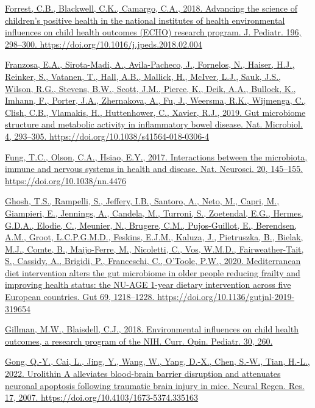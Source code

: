 \documentclass[
]{article}
\begin{document}
\href{https://www.zotero.org/google-docs/?uydJ8e}{Forrest, C.B.,
Blackwell, C.K., Camargo, C.A., 2018. Advancing the science of
children's positive health in the national institutes of health
environmental influences on child health outcomes (ECHO) research
program. J. Pediatr. 196, 298--300.
https://doi.org/10.1016/j.jpeds.2018.02.004}

\href{https://www.zotero.org/google-docs/?uydJ8e}{Franzosa, E.A.,
Sirota-Madi, A., Avila-Pacheco, J., Fornelos, N., Haiser, H.J., Reinker,
S., Vatanen, T., Hall, A.B., Mallick, H., McIver, L.J., Sauk, J.S.,
Wilson, R.G., Stevens, B.W., Scott, J.M., Pierce, K., Deik, A.A.,
Bullock, K., Imhann, F., Porter, J.A., Zhernakova, A., Fu, J., Weersma,
R.K., Wijmenga, C., Clish, C.B., Vlamakis, H., Huttenhower, C., Xavier,
R.J., 2019. Gut microbiome structure and metabolic activity in
inflammatory bowel disease. Nat. Microbiol. 4, 293--305.
https://doi.org/10.1038/s41564-018-0306-4}

\href{https://www.zotero.org/google-docs/?uydJ8e}{Fung, T.C., Olson,
C.A., Hsiao, E.Y., 2017. Interactions between the microbiota, immune and
nervous systems in health and disease. Nat. Neurosci. 20, 145--155.
https://doi.org/10.1038/nn.4476}

\href{https://www.zotero.org/google-docs/?uydJ8e}{Ghosh, T.S., Rampelli,
S., Jeffery, I.B., Santoro, A., Neto, M., Capri, M., Giampieri, E.,
Jennings, A., Candela, M., Turroni, S., Zoetendal, E.G., Hermes, G.D.A.,
Elodie, C., Meunier, N., Brugere, C.M., Pujos-Guillot, E., Berendsen,
A.M., Groot, L.C.P.G.M.D., Feskins, E.J.M., Kaluza, J., Pietruszka, B.,
Bielak, M.J., Comte, B., Maijo-Ferre, M., Nicoletti, C., Vos, W.M.D.,
Fairweather-Tait, S., Cassidy, A., Brigidi, P., Franceschi, C., O'Toole,
P.W., 2020. Mediterranean diet intervention alters the gut microbiome in
older people reducing frailty and improving health status: the NU-AGE
1-year dietary intervention across five European countries. Gut 69,
1218--1228. https://doi.org/10.1136/gutjnl-2019-319654}

\href{https://www.zotero.org/google-docs/?uydJ8e}{Gillman, M.W.,
Blaisdell, C.J., 2018. Environmental influences on child health
outcomes, a research program of the NIH. Curr. Opin. Pediatr. 30, 260.}

\href{https://www.zotero.org/google-docs/?uydJ8e}{Gong, Q.-Y., Cai, L.,
Jing, Y., Wang, W., Yang, D.-X., Chen, S.-W., Tian, H.-L., 2022.
Urolithin A alleviates blood-brain barrier disruption and attenuates
neuronal apoptosis following traumatic brain injury in mice. Neural
Regen. Res. 17, 2007. https://doi.org/10.4103/1673-5374.335163}
\end{document}
